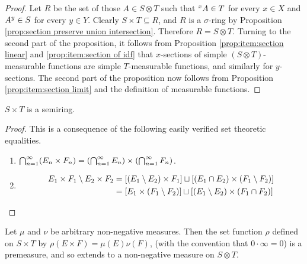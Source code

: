 \begin{proof}
Let $R$ be the set of those $A\in S\otimes T$ such that $\xsec{A}{x}\in T$ for every $x\in X$ and $\ysec{A}{y}\in S$ for every $y\in Y$. Clearly $S\times T\subseteq R$, and $R$ is a $\sigma$-ring by Proposition \ref{prop:section preserve union intersection}. Therefore $R=S\otimes T$. Turning to the second part of the proposition, it follows from Proposition \ref{prop:item:section linear} and \ref{prop:item:section of idf} that $x$-sections of simple $(S\otimes T)$-measurable functions are simple $T$-measurable functions, and similarly for $y$-sections. The second part of the proposition now follows from Proposition \ref{prop:item:section limit} and the definition of measurable functions.
\end{proof}

\begin{lemma}
$S\times T$ is a semiring.
\end{lemma}

\begin{proof}
This is a consequence of the following easily verified set theoretic equalities.
\begin{enumerate}
    \item $\bigcap_{n=1}^\infty(E_n\times F_n)=\br{\bigcap_{n=1}^\infty E_n}\times\br{\bigcap_{n=1}^\infty F_n}$.
    
    \item
    \begin{align*}
        E_1\times F_1\sd E_2\times F_2&=\sbr{(E_1\sd E_2)\times F_1}\du[(E_1\cap E_2)\times(F_1\sd F_2)]\\
        &=[E_1\times(F_1\sd F_2)]\du[(E_1\sd E_2)\times(F_1\cap F_2)]
    \end{align*}
\end{enumerate}
\end{proof}

\begin{theorem}\label{thm:product premeasure is premeasure}
Let $\mu$ and $\nu$ be arbitrary non-negative measures. Then the set function $\rho$ defined on $S\times T$ by $\rho(E\times F)=\mu(E)\nu(F)$, (with the convention that $0\cdot\infty=0$) is a premeasure, and so extends to a non-negative measure on $S\otimes T$.
\end{theorem}


